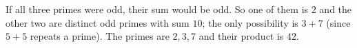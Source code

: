 If all three primes were odd, their sum would be odd. So one of them is $2$ and the other two are distinct odd primes with sum $10$; the only possibility is $3+7$ (since $5+5$ repeats a prime). The primes are $2,3,7$ and their product is $\boxed{42}$.
